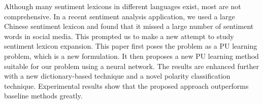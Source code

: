 Although many sentiment lexicons in different languages exist, most are not comprehensive. In a recent sentiment analysis application, we used a large Chinese sentiment lexicon and found that it missed a large number of sentiment words in social media. This prompted us to make a new attempt to study sentiment lexicon expansion. This paper first poses the problem as a PU learning problem, which is a new formulation. It then proposes a new PU learning method suitable for our problem using a neural network. The results are enhanced further with a new dictionary-based technique and a novel polarity classification technique. Experimental results show that the proposed approach outperforms baseline methods greatly.
